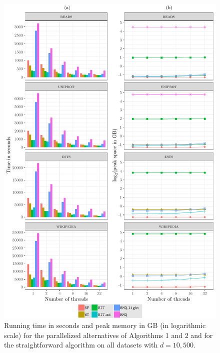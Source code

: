 \documentclass{elsarticle}
\begin{document}
\begin{figure}
 \centering
 \includegraphics[width=1.0\textwidth]{fig_all_parallel.pdf}
\caption{Running time in seconds and peak memory in GB (in logarithmic
  scale) for the parallelized alternatives of Algorithms 1 and 2 and for the straightforward
  algorithm on all datasets with $d=10,500$.}
\label{f:parallel}
\end{figure}
\end{document}
